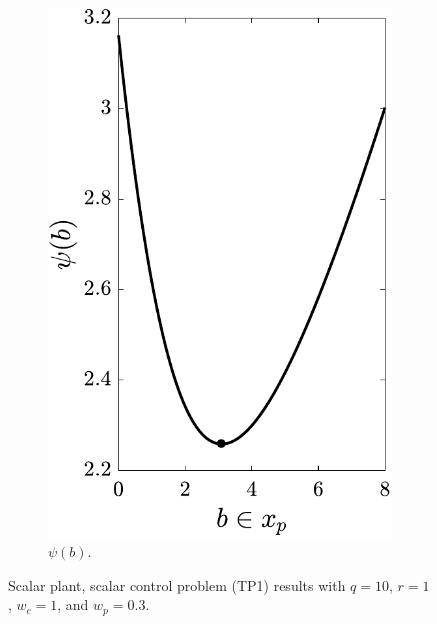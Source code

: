 \begin{figure}[t!]
\begin{subfigure}[b]{0.266666666667\columnwidth}
        \includegraphics[width=\textwidth]{../ch3/figures/T2_1_nested}%
        \vspace{0.03in}
        \caption{$\psi(b)$.\label{fig:ch3:T2_1_nested}}
\end{subfigure}%
\caption[Scalar plant, scalar control problem (TP1) results]{Scalar plant, scalar control problem (TP1) results with $q=10$, $r=1$, $w_c = 1$, and $w_p = 0.3$.\label{fig:ch3:T2_1}}
\end{figure}
